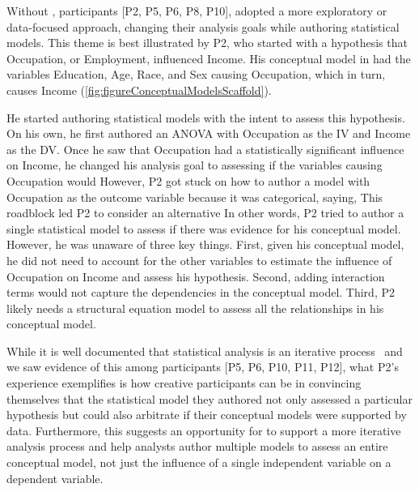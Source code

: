 Without \rTisane, participants [P2, P5, P6, P8, P10], adopted a more exploratory
or data-focused approach, changing their analysis goals while authoring
statistical models. This theme is best illustrated by P2, who started with a
hypothesis that Occupation, or Employment, influenced Income. His conceptual
model in \rTisane had the variables Education, Age, Race, and Sex causing
Occupation, which in turn, causes Income (\autoref{fig:figureConceptualModelsScaffold}). 

He started authoring statistical models with the intent to assess this
hypothesis. On his own, he first authored an ANOVA with Occupation as the IV and
Income as the DV. Once he saw that Occupation had a statistically significant
influence on Income, he changed his analysis goal to assessing if the variables
causing Occupation would  However, P2 got stuck on how to author a model
with Occupation as the outcome variable because it was categorical, saying,
 This roadblock led P2 to consider an alternative
 In other words,
P2 tried to author a single statistical model to assess if there was evidence
for his conceptual model. However, he was unaware of three key things. First,
given his conceptual model, he did not need to account for the other variables
to estimate the influence of Occupation on Income and assess his hypothesis.
Second, adding interaction terms would not capture the dependencies in the
conceptual model. Third, P2 likely needs a structural equation model to assess all the relationships in his conceptual model.

While it is well documented that statistical analysis is an iterative
process~\cite{grolemund2014cognitive, jun2022hypoForm} and we saw evidence of
this among participants [P5, P6, P10, P11, P12], what P2's experience
exemplifies is how creative participants can be in convincing themselves that the
statistical model they authored not only assessed a particular hypothesis but
could also arbitrate if their conceptual models were supported by data.
Furthermore, this suggests an opportunity for \rTisane to support a more
iterative analysis process and help analysts author multiple models to assess an
entire conceptual model, not just the influence of a single independent variable
on a dependent variable. 

